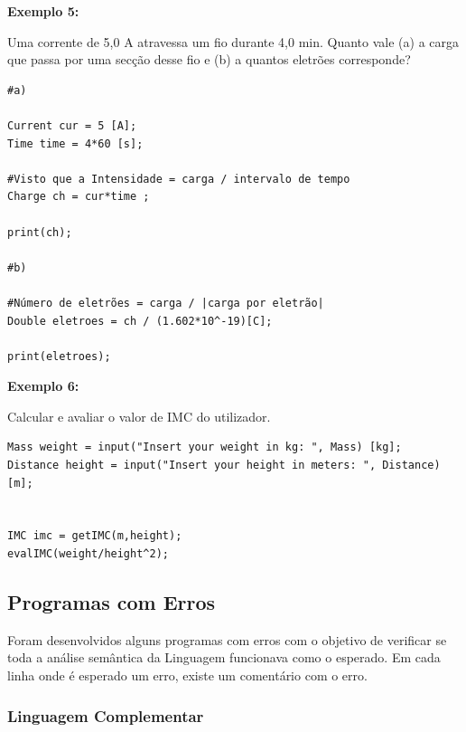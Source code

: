 \documentclass[10pt,portuguese]{article}
\begin{document}
\par \textbf{Exemplo 5:}

\par Uma corrente de 5,0 A atravessa um fio durante 4,0 min. Quanto vale (a) a carga que passa por uma secção desse fio e (b) a quantos eletrões corresponde?

\begin{lstlisting}
#a)

Current cur = 5 [A];
Time time = 4*60 [s];

#Visto que a Intensidade = carga / intervalo de tempo
Charge ch = cur*time ;

print(ch);

#b)

#Número de eletrões = carga / |carga por eletrão|
Double eletroes = ch / (1.602*10^-19)[C];

print(eletroes);
\end{lstlisting}

\par \textbf{Exemplo 6:}

\par Calcular e avaliar o valor de IMC do utilizador.

\begin{lstlisting}
Mass weight = input("Insert your weight in kg: ", Mass) [kg];
Distance height = input("Insert your height in meters: ", Distance) [m];


IMC imc = getIMC(m,height);
evalIMC(weight/height^2);
\end{lstlisting}

\clearpage

\subsection{Programas com Erros}

\par Foram desenvolvidos alguns programas com erros com o objetivo de verificar se toda a análise semântica da Linguagem funcionava como o esperado. Em cada linha onde é esperado um erro, existe um comentário com o erro.

\subsubsection{Linguagem Complementar}
\end{document}
